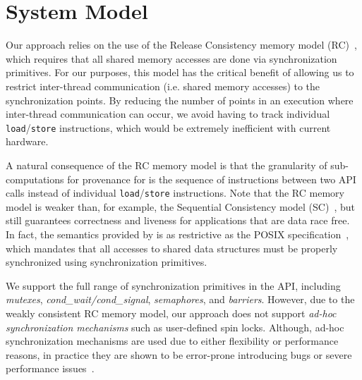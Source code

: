 \section{System Model}
\label{sec:model}

 Our approach relies on the use of the
Release Consistency memory model (RC)~\cite{DSM-RC}, which requires that all shared memory accesses are done via synchronization primitives.
For our purposes, this model has the critical
benefit of allowing us to restrict inter-thread communication (i.e. shared
memory accesses) to the synchronization points. By reducing the number of 
points in an execution where inter-thread communication can occur, we avoid
having to track individual {\tt load}/{\tt store} instructions, %
which would be extremely inefficient with current hardware. 

A natural consequence of the RC memory model is that the granularity of sub-computations for provenance for \projecttitle is the sequence of instructions between two \pthreads API calls instead of  individual {\tt load}/{\tt store} instructions. Note that the RC memory model is weaker
than, for example, the Sequential Consistency model (SC)~\cite{scLamport}, but
still guarantees correctness and liveness for applications that are data race
free. In fact,  the semantics provided by
\projecttitle is as restrictive as the POSIX specification~\cite{pthreads-spec}, which mandates that all accesses to shared data structures must be properly synchronized using 
\pthreads synchronization primitives. 

 We support the full range of synchronization
primitives in the \pthreads API, including {\em mutexes}, {\em cond\_wait/cond\_signal}, {\em semaphores},  and {\em
barriers}. However, due to the weakly consistent RC memory model, our approach
does not support {\em ad-hoc synchronization mechanisms} such as user-defined spin locks. 
Although, ad-hoc synchronization mechanisms are used due to either flexibility
or performance reasons, in practice they are shown to be
error-prone introducing bugs or severe performance issues~\cite{adhoc-sync}.
%
